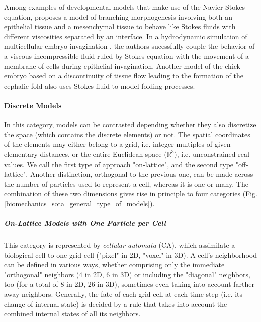 Among examples of developmental models that make use of the Navier-Stokes equation, \cite{Lubkin:2002gv} proposes a model of branching morphogenesis involving both an epithelial tissue and a mesenchymal tissue to behave like Stokes fluids with different viscosities separated by an interface. In a hydrodynamic simulation of multicellular embryo invagination \cite{Pouille:2008jz}, the authors sucessfully couple the behavior of a viscous incompressible fluid ruled by Stokes equation with the movement of a membrane of cells during epithelial invagination. Another model of the chick embryo based on a discontinuity of tissue flow leading to the formation of the cephalic fold \cite{Fleury:2011gx} also uses Stokes fluid to model folding processes.


\paragraph{Discrete Models}


In this category, models can be contrasted depending whether they also discretize the space (which contains the discrete elements) or not. The spatial coordinates of the elements may either belong to a grid, i.e. integer multiples of given elementary distances, or the entire Euclidean space ($\mathbb{R}^3$), i.e. unconstrained real values. We call the first type of approach "on-lattice", and the second type "off-lattice". Another distinction, orthogonal to the previous one, can be made across the number of particles used to represent a cell, whereas it is one or many. The combination of these two dimensions gives rise in principle to four categories (Fig. \ref{biomechanics_sota_general_type_of_models}).

\subparagraph{On-Lattice Models with One Particle per Cell}


This category is represented by \textit{cellular automata} (CA), which assimilate a biological cell to one grid cell ("pixel" in 2D, "voxel" in 3D). A cell's neighborhood can be defined in various ways, whether comprising only the immediate "orthogonal" neighbors (4 in 2D, 6 in 3D) or including the "diagonal" neighbors, too (for a total of 8 in 2D, 26 in 3D), sometimes even taking into account farther away neighbors. Generally, the fate of each grid cell at each time step (i.e. its change of internal state) is decided by a rule that takes into account the combined internal states of all its neighbors.

